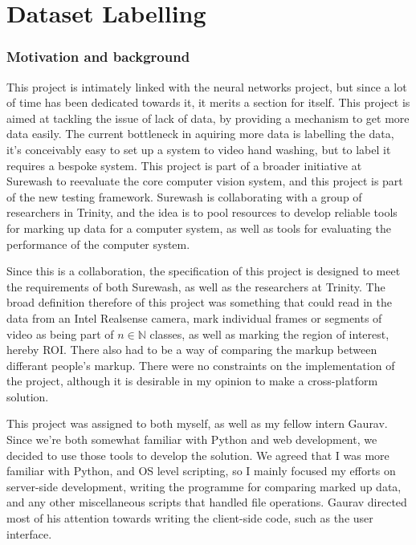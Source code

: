 \part{Dataset Labelling}
\section{Motivation and background}
This project is intimately linked with the neural networks project, but since a lot of time has been dedicated towards it, it merits a section for itself. This project is aimed at tackling the issue of lack of data, by providing a mechanism to get more data easily. The current bottleneck in aquiring more data is labelling the data, it's conceivably easy to set up a system to video hand washing, but to label it requires a bespoke system. This project is part of a broader initiative at Surewash to reevaluate the core computer vision system, and this project is part of the new testing framework. Surewash is collaborating with a group of researchers in Trinity, and the idea is to pool resources to develop reliable tools for marking up data for a computer system, as well as tools for evaluating the performance of the computer system.

Since this is a collaboration, the specification of this project is designed to meet the requirements of both Surewash, as well as the researchers at Trinity. The broad definition therefore of this project was something that could read in the data from an Intel Realsense camera, mark individual frames or segments of video as being part of $n \in \mathbb{N}$ classes, as well as marking the region of interest, hereby ROI. There also had to be a way of comparing the markup between differant people's markup. There were no constraints on the implementation of the project, although it is desirable in my opinion to make a cross-platform solution.

This project was assigned to both myself, as well as my fellow intern Gaurav. Since we're both somewhat familiar with Python and web development, we decided to use those tools to develop the solution. We agreed that I was more familiar with Python, and OS level scripting, so I mainly focused my efforts on server-side development, writing the programme for comparing marked up data, and any other miscellaneous scripts that handled file operations. Gaurav directed most of his attention towards writing the client-side code, such as the user interface.  

